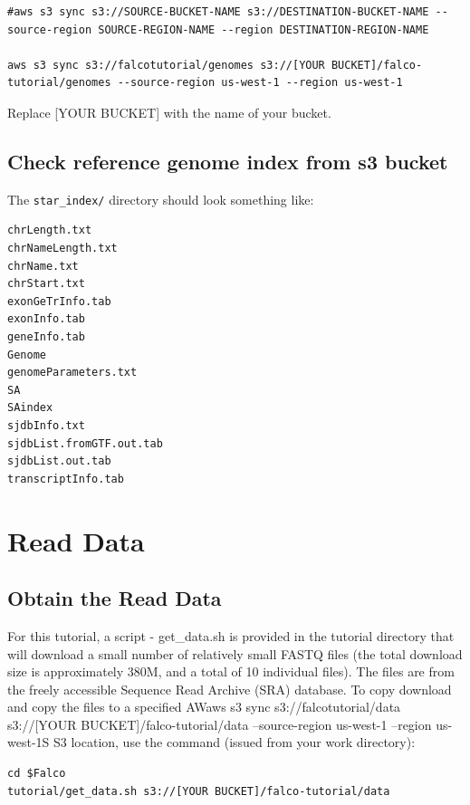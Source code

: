 \documentclass[
]{book}
\begin{document}
\begin{verbatim}
#aws s3 sync s3://SOURCE-BUCKET-NAME s3://DESTINATION-BUCKET-NAME --source-region SOURCE-REGION-NAME --region DESTINATION-REGION-NAME

aws s3 sync s3://falcotutorial/genomes s3://[YOUR BUCKET]/falco-tutorial/genomes --source-region us-west-1 --region us-west-1
\end{verbatim}

Replace {[}YOUR BUCKET{]} with the name of your bucket.

\hypertarget{check-reference-genome-index-from-s3-bucket}{%
\section{Check reference genome index from s3 bucket}\label{check-reference-genome-index-from-s3-bucket}}

The \texttt{star\_index/} directory should look something like:

\begin{verbatim}
chrLength.txt
chrNameLength.txt
chrName.txt
chrStart.txt
exonGeTrInfo.tab
exonInfo.tab
geneInfo.tab
Genome
genomeParameters.txt
SA
SAindex
sjdbInfo.txt
sjdbList.fromGTF.out.tab
sjdbList.out.tab
transcriptInfo.tab
\end{verbatim}

\hypertarget{read-data}{%
\chapter{Read Data}\label{read-data}}

\hypertarget{obtain-the-read-data}{%
\section{Obtain the Read Data}\label{obtain-the-read-data}}

For this tutorial, a script - get\_data.sh is provided in the tutorial directory that will download a small number of relatively small FASTQ files (the total download size is approximately 380M, and a total of 10 individual files). The files are from the freely accessible Sequence Read Archive (SRA) database. To copy download and copy the files to a specified AWaws s3 sync s3://falcotutorial/data s3://{[}YOUR BUCKET{]}/falco-tutorial/data --source-region us-west-1 --region us-west-1S S3 location, use the command (issued from your work directory):

\begin{verbatim}
cd $Falco
tutorial/get_data.sh s3://[YOUR BUCKET]/falco-tutorial/data
\end{verbatim}
\end{document}
